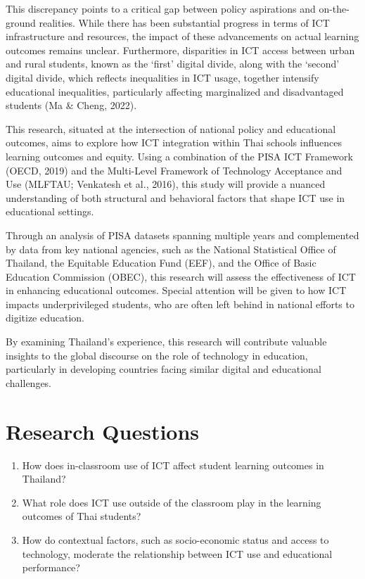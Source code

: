 \documentclass[
]{article}
\begin{document}
This discrepancy points to a critical gap between policy aspirations and
on-the-ground realities. While there has been substantial progress in
terms of ICT infrastructure and resources, the impact of these
advancements on actual learning outcomes remains unclear. Furthermore,
disparities in ICT access between urban and rural students, known as the
`first' digital divide, along with the `second' digital divide, which
reflects inequalities in ICT usage, together intensify educational
inequalities, particularly affecting marginalized and disadvantaged
students (Ma \& Cheng, 2022).

This research, situated at the intersection of national policy and
educational outcomes, aims to explore how ICT integration within Thai
schools influences learning outcomes and equity. Using a combination of
the PISA ICT Framework (OECD, 2019) and the Multi-Level Framework of
Technology Acceptance and Use (MLFTAU; Venkatesh et al., 2016), this
study will provide a nuanced understanding of both structural and
behavioral factors that shape ICT use in educational settings.

Through an analysis of PISA datasets spanning multiple years and
complemented by data from key national agencies, such as the National
Statistical Office of Thailand, the Equitable Education Fund (EEF), and
the Office of Basic Education Commission (OBEC), this research will
assess the effectiveness of ICT in enhancing educational outcomes.
Special attention will be given to how ICT impacts underprivileged
students, who are often left behind in national efforts to digitize
education.

By examining Thailand's experience, this research will contribute
valuable insights to the global discourse on the role of technology in
education, particularly in developing countries facing similar digital
and educational challenges.

\hypertarget{research-questions}{%
\section{Research Questions}\label{research-questions}}

\begin{enumerate}
\def\labelenumi{\arabic{enumi}.}
\item
  How does in-classroom use of ICT affect student learning outcomes in
  Thailand?
\item
  What role does ICT use outside of the classroom play in the learning
  outcomes of Thai students?
\item
  How do contextual factors, such as socio-economic status and access to
  technology, moderate the relationship between ICT use and educational
  performance?
\end{enumerate}
\end{document}

